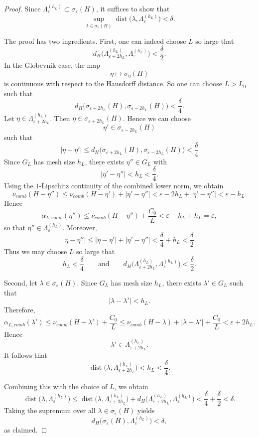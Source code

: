 \documentclass[10pt,a4paper]{amsart}
\newcommand{\dist}{\operatorname{dist}}
\begin{document}
\begin{proof}
Since $\Lambda_\varepsilon^{(h_L)}\subset \sigma_\varepsilon(H)$, it suffices to show that
\[
\sup_{\lambda\in\sigma_\varepsilon(H)}
\dist\bigl(\lambda,\Lambda_\varepsilon^{(h_L)}\bigr)<\delta.
\]

The proof has two ingredients. First, one can indeed choose $L$ so large that
\[
d_H\bigl(\Lambda_{\varepsilon+2h_L}^{(h_L)},\Lambda_\varepsilon^{(h_L)}\bigr)<\frac{\delta}{2}.
\]
In the Globevnik case, the map
\[
\eta\longmapsto \sigma_\eta(H)
\]
is continuous with respect to the Hausdorff distance. So one can choose $L>L_0$ such that
\[
d_H\bigl(\sigma_{\varepsilon+2h_L}(H),\sigma_{\varepsilon-2h_L}(H)\bigr) < \frac{\delta}{4}.
\]
Let $\eta\in \Lambda_{\varepsilon+2h_L}^{(h_L)}$. Then $\eta\in \sigma_{\varepsilon+2h_L}(H)$. Hence we can choose
\[
\eta'\in \sigma_{\varepsilon-2h_L}(H)
\]
such that
\[
|\eta-\eta'|
\le d_H\bigl(\sigma_{\varepsilon+2h_L}(H),\sigma_{\varepsilon-2h_L}(H)\bigr) < \frac{\delta}{4}
\]
Since $G_L$ has mesh size $h_L$, there exists $\eta''\in G_L$ with
\[
|\eta'-\eta''|< h_L < \frac{\delta}{4}.
\]
Using the $1$-Lipschitz continuity of the combined lower norm, we obtain
\[
\nu_{comb}(H-\eta'')
\le \nu_{comb}(H-\eta')+|\eta'-\eta''|
< \varepsilon-2h_L+|\eta'-\eta''|
< \varepsilon-h_L.
\]
Hence
\[
\alpha_{L,comb}(\eta'')
\le \nu_{comb}(H-\eta'')+\frac{C_0}{L}
< \varepsilon-h_L+h_L
= \varepsilon,
\]
so that $\eta''\in \Lambda_\varepsilon^{(h_L)}$. Moreover,
\[
|\eta-\eta''|
\le |\eta-\eta'|+|\eta'-\eta''|
< \frac{\delta}{4}+h_L < \frac{\delta}{2}.
\]
\noindent
Thus we may choose $L$ so large that
\[
h_L<\frac{\delta}{4}
\qquad\text{and}\qquad
d_H\bigl(\Lambda_{\varepsilon+2h_L}^{(h_L)},\Lambda_\varepsilon^{(h_L)}\bigr)<\frac{\delta}{2}.
\]

Second, let $\lambda\in \sigma_\varepsilon(H)$. Since $G_L$ has mesh size $h_L$, there exists $\lambda'\in G_L$ such that
\[
|\lambda-\lambda'|<h_L.
\]
Therefore,
\[
\alpha_{L,comb}(\lambda')
\le \nu_{comb}(H-\lambda')+\frac{C_0}{L}
\le \nu_{comb}(H-\lambda)+|\lambda-\lambda'|+\frac{C_0}{L}
< \varepsilon+2h_L.
\]
Hence
\[
\lambda'\in \Lambda_{\varepsilon+2h_L}^{(h_L)}.
\]
It follows that
\[
\dist\bigl(\lambda,\Lambda_{\varepsilon+2h_L}^{(h_L)}\bigr)<h_L<\frac{\delta}{4}.
\]

Combining this with the choice of $L$, we obtain
\[
\dist\bigl(\lambda,\Lambda_\varepsilon^{(h_L)}\bigr)
\le
\dist\bigl(\lambda,\Lambda_{\varepsilon+2h_L}^{(h_L)}\bigr)
+
d_H\bigl(\Lambda_{\varepsilon+2h_L}^{(h_L)},\Lambda_\varepsilon^{(h_L)}\bigr)
<
\frac{\delta}{4}+\frac{\delta}{2}
<
\delta.
\]
Taking the supremum over all $\lambda\in \sigma_\varepsilon(H)$ yields
\[
d_H\bigl(\sigma_\varepsilon(H),\Lambda_\varepsilon^{(h_L)}\bigr)<\delta,
\]
as claimed.
\end{proof}
\end{document}
